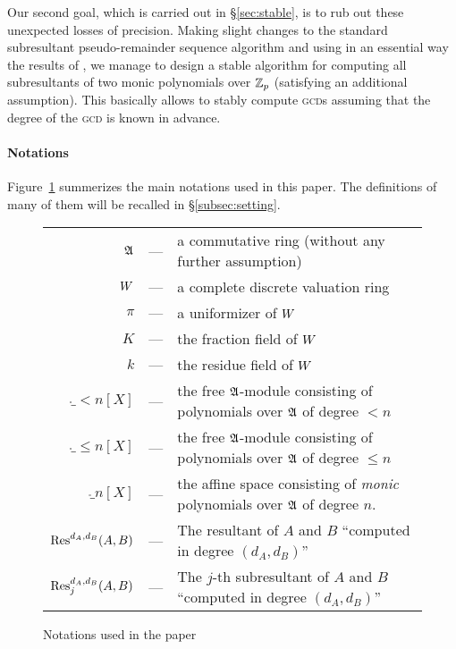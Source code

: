 \documentclass{article}
\begin{document}
Our second goal, which is carried out in \S \ref{sec:stable}, is to rub 
out these unexpected losses of precision. Making slight changes to the 
standard subresultant pseudo-remainder sequence algorithm and using in 
an essential way the results of \cite{padicprec}, we manage to design a stable 
algorithm for computing all subresultants of two monic polynomials over 
$\mathbb Z_p$ (satisfying an additional assumption). This basically allows 
to stably compute \textsc{gcd}s assuming that the degree of the 
\textsc{gcd} is known in advance.

\paragraph{Notations}

Figure~\ref{fig:notations} summerizes the main notations used in
this paper. The definitions of many of them will be recalled in 
\S \ref{subsec:setting}.

\begin{figure}
\begin{center}
\begin{tabular}{rcl}
$\mathfrak A$ &--- & a commutative ring (without any further assumption) \\
$W$ &---& a complete discrete valuation ring \\
$\pi$ &---& a uniformizer of $W$ \\
$K$ &---& the fraction field of $W$ \\
$k$ &---& the residue field of $W$ \smallskip \\

$\ring_{<n}[X]$ &---& the free $\mathfrak A$-module consisting of
polynomials over $\mathfrak A$ of degree $<n$ \\
$\ring_{\leq n}[X]$ &---& the free $\mathfrak A$-module consisting of
polynomials over $\mathfrak A$ of degree $\leq n$ \\
$\ring_n[X]$ &---& the affine space consisting of \emph{monic}
polynomials over $\mathfrak A$ of degree $n$. \smallskip \\

$\text{\rm Res}^{d_A,d_B}(A,B)$ &---& The resultant of $A$ and
$B$ ``computed in degree $(d_A,d_B)$'' \\
$\text{\rm Res}_j^{d_A,d_B}(A,B)$ &---& The $j$-th subresultant of $A$ and
$B$ ``computed in degree $(d_A,d_B)$'' \\
\end{tabular}
\end{center}

\vspace{-0.2cm}

\caption{Notations used in the paper}
\label{fig:notations}
\end{figure}
\end{document}
